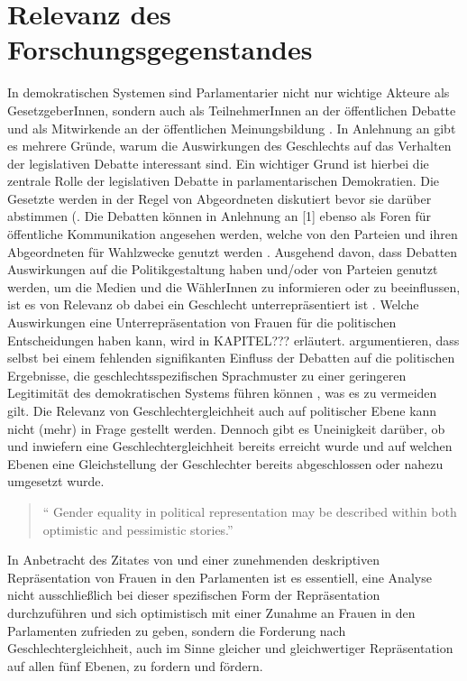 \documentclass[12pt, 
    twoside=false, 
    bibliography=totoc, 
    numbers=endperiod, 
    headings=normal, 
    toc=chapterentrydotfill
    ]{scrbook}
\begin{document}
\chapter{Relevanz des Forschungsgegenstandes}


In demokratischen Systemen sind Parlamentarier nicht nur wichtige Akteure als GesetzgeberInnen, sondern auch als TeilnehmerInnen an der öffentlichen Debatte und als Mitwirkende an der öffentlichen Meinungsbildung  \parencite[188]{dahlerup_2018}.
In Anlehnung an \textcite{back_2018} gibt es mehrere Gründe, warum die Auswirkungen des Geschlechts auf das Verhalten der legislativen Debatte interessant sind. Ein wichtiger Grund ist hierbei die zentrale Rolle der legislativen Debatte in parlamentarischen Demokratien. Die Gesetzte werden in der Regel von Abgeordneten diskutiert bevor sie darüber abstimmen (\parencites[2]{back_2018}{back_2016}{proksch_2015}. 
Die Debatten können in Anlehnung an \textcite{proksch_2015}[1] ebenso als Foren für öffentliche Kommunikation angesehen werden, welche von den Parteien und ihren Abgeordneten für Wahlzwecke genutzt werden \parencite[2]{back_2018}. Ausgehend davon, dass Debatten Auswirkungen auf die Politikgestaltung haben und/oder von Parteien genutzt werden, um die Medien und die WählerInnen zu informieren oder zu beeinflussen, ist es von Relevanz ob dabei ein Geschlecht unterrepräsentiert ist \parencite[2]{back_2018}. Welche Auswirkungen eine Unterrepräsentation von Frauen für die politischen Entscheidungen haben kann, wird in KAPITEL??? erläutert. \textcite{back_2018} argumentieren, dass selbst bei einem fehlenden signifikanten Einfluss der Debatten auf die politischen Ergebnisse, die geschlechtsspezifischen Sprachmuster zu einer geringeren Legitimität des demokratischen Systems führen können \parencite[2]{back_2018}, was es zu vermeiden gilt.
Die Relevanz von Geschlechtergleichheit auch auf politischer Ebene kann nicht (mehr) in Frage gestellt werden. Dennoch gibt es Uneinigkeit darüber, ob und inwiefern eine Geschlechtergleichheit bereits erreicht wurde und auf welchen Ebenen eine Gleichstellung der Geschlechter bereits abgeschlossen oder nahezu umgesetzt wurde.

\begin{quote}
\enquote{
Gender equality in political representation may be described within both optimistic
and pessimistic stories.} \parencite[149]{celis_2018}
\end{quote}

In Anbetracht des Zitates von \textcite{celis_2018} und einer zunehmenden deskriptiven Repräsentation von Frauen in den Parlamenten ist es essentiell, eine Analyse nicht ausschließlich bei dieser spezifischen Form der Repräsentation durchzuführen und sich optimistisch mit einer Zunahme an Frauen in den Parlamenten zufrieden zu geben, sondern die Forderung nach Geschlechtergleichheit, auch im Sinne gleicher und gleichwertiger Repräsentation auf allen fünf Ebenen, zu fordern und fördern. 
\end{document}
